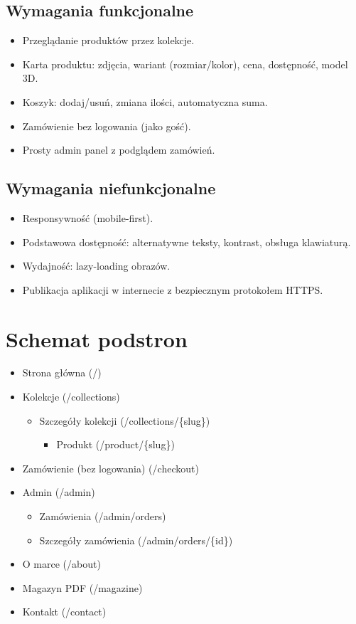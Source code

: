 \documentclass[14pt]{extarticle}
\begin{document}
		\subsection{Wymagania funkcjonalne}
		\begin{itemize}
			\item Przeglądanie produktów przez kolekcje.
			\item Karta produktu: zdjęcia, wariant (rozmiar/kolor), cena, dostępność, model 3D.
			\item Koszyk: dodaj/usuń, zmiana ilości, automatyczna suma.
			\item Zamówienie bez logowania (jako gość).
			\item Prosty admin panel z podglądem zamówień.
		\end{itemize}

		\subsection{Wymagania niefunkcjonalne}
		\begin{itemize}
			\item Responsywność (mobile-first).
			\item Podstawowa dostępność: alternatywne teksty, kontrast, obsługa klawiaturą.
			\item Wydajność: lazy-loading obrazów.
			\item Publikacja aplikacji w internecie z bezpiecznym protokołem HTTPS.
		\end{itemize}
		
	\section{Schemat podstron}
		\begin{itemize}
			\item Strona główna (/)
			\item Kolekcje (/collections)
			\begin{itemize}
				\item Szczegóły kolekcji (/collections/\{slug\})
				\begin{itemize}
					\item Produkt (/product/\{slug\})
				\end{itemize}
			\end{itemize}
			\item Zamówienie (bez logowania) (/checkout)
			\item Admin (/admin)
			\begin{itemize}
				\item Zamówienia (/admin/orders)
				\item Szczegóły zamówienia (/admin/orders/\{id\})
			\end{itemize}
			\item O marce (/about)
			\item Magazyn PDF (/magazine)
			\item Kontakt (/contact)
		\end{itemize}
	
\end{document}
